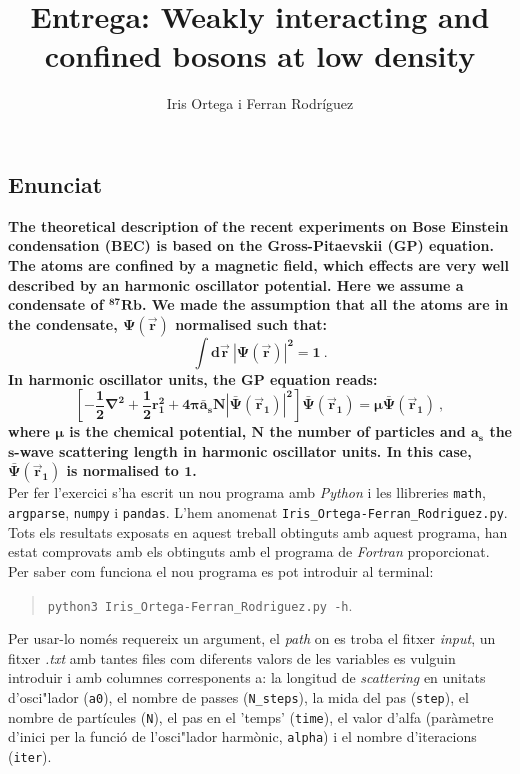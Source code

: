\documentclass[a4paper]{article}
\title{Entrega: Weakly interacting and confined bosons at low density}
\author{Iris Ortega i Ferran Rodríguez}
\begin{document}
\maketitle{}


\subsection*{Enunciat}

\textbf{The theoretical description of the recent experiments on Bose Einstein condensation (BEC) is based on the Gross-Pitaevskii (GP) equation. The atoms are confined by a magnetic field, which effects are very well described by an harmonic oscillator potential. Here we assume a condensate of $\boldsymbol{^{87}Rb}$. We made the assumption that all the atoms are in the condensate, $\boldsymbol{\Psi(\vec{r})}$ normalised such that:}
\begin{equation}
    \boldsymbol{\int d\vec{r}\ |\Psi(\vec{r})|^2=1 \ .}
\end{equation}
\textbf{In harmonic oscillator units, the GP equation reads:}
\begin{equation}
    \boldsymbol{\left[-\dfrac{1}{2}\nabla^2 +\dfrac{1}{2}r_1^2+4\pi \bar a_s N |\bar\Psi(\vec{r}_1)|^2\right]\bar\Psi(\vec{r}_1)=\mu \bar\Psi(\vec{r}_1)\ ,}
\end{equation}
\textbf{where $\boldsymbol{\mu}$ is the chemical potential, $\mathbf{N}$ the number of particles and $\mathbf{a_s}$ the $\mathbf{s}$-wave scattering length in harmonic oscillator units. In this case, $\boldsymbol{\bar\Psi(\vec{r}_1)}$ is normalised to $\mathbf{1}$.}\\

Per fer l'exercici s'ha escrit un nou programa amb \textit{Python} i les llibreries \texttt{math}, \texttt{argparse}, \texttt{numpy} i \texttt{pandas}. L'hem anomenat \texttt{Iris\_Ortega-Ferran\_Rodriguez.py}. Tots els resultats exposats en aquest treball obtinguts amb aquest programa, han estat comprovats amb els obtinguts amb el programa de \textit{Fortran} proporcionat. Per saber com funciona el nou programa es pot introduir al terminal:
\begin{quote}
    \texttt{python3 Iris\_Ortega-Ferran\_Rodriguez.py -h}.
\end{quote}
Per usar-lo només requereix un argument, el \textit{path} on es troba el fitxer \textit{input}, un fitxer \textit{.txt} amb tantes files com diferents valors de les variables es vulguin introduir i amb columnes corresponents a: la longitud de \textit{scattering} en unitats d'osci"lador (\texttt{a0}), el nombre de passes (\texttt{N\_steps}), la mida del pas (\texttt{step}), el nombre de partícules (\texttt{N}), el pas en el 'temps' (\texttt{time}), el valor d'alfa (paràmetre d'inici per la funció de l'osci"lador harmònic, \texttt{alpha}) i el nombre d'iteracions (\texttt{iter}).
\end{document}
